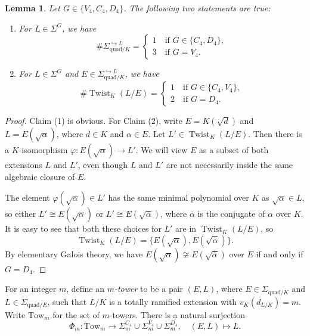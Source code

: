 \documentclass[11pt]{amsart}
\theoremstyle{theorem}
\newtheorem{lemma}[theorem]{Lemma}
\theoremstyle{example}
\theoremstyle{definition}
\numberwithin{theorem}{section}
\numberwithin{theorem}{section}
\DeclareMathOperator{\Twist}{Twist}
\newcommand{\quadr}{\mathrm{quad}}
\newcommand{\Tow}{\mathrm{Tow}}
\begin{document}
\begin{lemma}
    \label{lem-size-of-Xi}
    Let $G \in \{V_4, C_4, D_4\}$. The following two statements are true:
    \begin{enumerate}
        \item For $L \in \Sigma^G$, we have
        $$
        \# \Sigma_{\quadr/K}^{\hookrightarrow L} = \begin{cases}
            1 \quad\text{if $G \in \{C_4, D_4\}$},
            \\
            3\quad\text{if $G = V_4$}.
        \end{cases}
        $$
        \item For $L \in \Sigma^G$ and $E \in \Sigma_{\quadr/K}^{\hookrightarrow L}$, we have 
        $$
        \# \Twist_K(L/E) = \begin{cases}
            1 \quad\text{if $G \in \{C_4, V_4\}$},
            \\
            2 \quad\text{if $G = D_4$}. 
        \end{cases}
        $$
    \end{enumerate}
\end{lemma}
\begin{proof}
    Claim (1) is obvious. For Claim (2), write $E = K(\sqrt{d})$ and $L = E(\sqrt{\alpha})$, where $d \in K$ and $\alpha \in E$. Let $L' \in \Twist_K(L/E)$. Then there is a $K$-isomorphism $\varphi: E(\sqrt{\alpha}) \to L'$. We will view $E$ as a subset of both extensions $L$ and $L'$, even though $L$ and $L'$ are not necessarily inside the same algebraic closure of $E$. 
    
    The element $\varphi(\sqrt{\alpha})\in L'$ has the same minimal polynomial over $K$ as $\sqrt{\alpha} \in L$, so either $L' \cong E(\sqrt{\alpha})$ or $L' \cong E(\sqrt{\overline{\alpha}})$, where $\overline{\alpha}$ is the conjugate of $\alpha$ over $K$. It is easy to see that both these choices for $L'$ are in $\Twist_K(L/E)$, so 
    $$
    \Twist_K(L/E) = \{E(\sqrt{\alpha}), E(\sqrt{\overline{\alpha}})\}.
    $$
    By elementary Galois theory, we have $E(\sqrt{\alpha})\not \cong E(\sqrt{\overline{\alpha}})$ over $E$ if and only if $G = D_4$. 
\end{proof}
For an integer $m$, define an \emph{$m$-tower} to be a pair $(E,L)$, where $E \in \Sigma_{\quadr/K}$ and $L \in \Sigma_{\quadr/E}$, such that $L/K$ is a totally ramified extension with $v_K(d_{L/K}) = m$. Write $\Tow_m$ for the set of $m$-towers. There is a natural surjection 
$$
\Phi_m : \Tow_m \to \Sigma_m^{C_4} \cup \Sigma_m^{V_4} \cup \Sigma_m^{D_4},\quad (E,L)\mapsto L. 
$$
\end{document}
